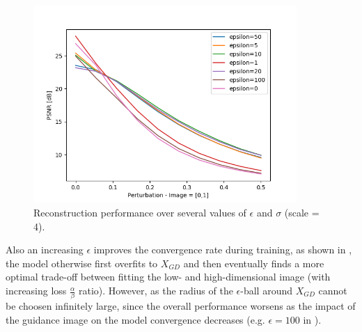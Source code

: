\begin{figure}[!htbp]
	\centering
	\includegraphics[width=10cm]{figures/epsball_perturbation}
	\caption{Reconstruction performance over several values of $\epsilon$
  and $\sigma$ (scale = 4).}
  \label{fig:epsball_perturbation}
\end{figure}

Also an increasing $\epsilon$ improves the convergence rate during training, as shown in , the model otherwise first overfits to $X_{GD}$ and then eventually finds a more optimal trade-off between fitting the low- and high-dimensional image (with increasing loss $\frac{\alpha}{\beta}$ ratio). However, as  the radius of the $\epsilon$-ball
around $X_{GD}$ cannot be choosen infinitely large, since the overall performance worsens as the impact of the guidance image on the model convergence decreases (e.g. $\epsilon = 100$ in ).

